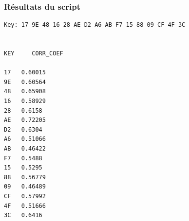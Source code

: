 \documentclass[a4paper, 12pt]{article}
\begin{document}
\newpage
		\subsubsection{Résultats du script}
\begin{lstlisting}
Key: 17 9E 48 16 28 AE D2 A6 AB F7 15 88 09 CF 4F 3C


KEY 	CORR_COEF
 	 
17 	 0.60015
9E 	 0.60564
48 	 0.65908
16 	 0.58929
28 	 0.6158
AE 	 0.72205
D2 	 0.6304
A6 	 0.51066
AB 	 0.46422
F7 	 0.5488
15 	 0.5295
88 	 0.56779
09 	 0.46489
CF 	 0.57992
4F 	 0.51666
3C 	 0.6416
\end{lstlisting}
\end{document}
